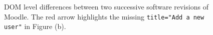 
\begin{figure}[ht!] 
\centering     %
{}
  \captionsetup{justification=justified,
singlelinecheck=false}
\caption{DOM level differences between two successive software revisions of Moodle. The red arrow highlights the missing \texttt{title="Add a new user"} in Figure (b). }
\label{fig:moodleDOM}
\end{figure} 

